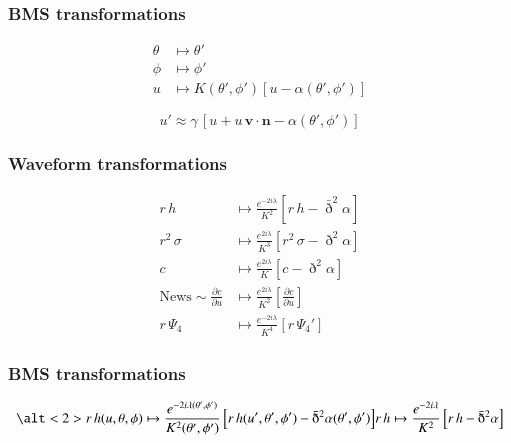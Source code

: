 \documentclass[12pt,xcolor={dvipsnames}]{beamer}
\renewcommand{\vec}{\bm}
\renewcommand{\vec}[1]{\boldsymbol{#1}}
\begin{document}
\begin{frame}
  \frametitle{BMS transformations}
  \begin{align*}
    \theta &\mapsto \theta' \\
    \phi &\mapsto \phi' \\
    u &\mapsto K(\theta', \phi') \left[u - \alpha(\theta', \phi')
        \right]
  \end{align*}

  \pause
  \begin{equation*}
    u' \approx \gamma\, \left[u + u\, \vec{v} \cdot \vec{n} -
      \alpha(\theta', \phi') \right]
  \end{equation*}
\end{frame}

\begin{frame}
  \frametitle{Waveform transformations}
  \begin{align*}
    r\, h %
    &\mapsto %
      \frac{e^{-2i \lambda}} {K^{2}} \left[ r\, h - \bar{\eth}^{2} \alpha
      \right] %
    \\
    r^{2}\, \sigma %
    &\mapsto %
      \frac{e^{2i \lambda}} {K^{3}} \left[ r^{2}\, \sigma - \eth^{2}
      \alpha \right] %
    \\
    c %
    &\mapsto %
      \frac{e^{2i \lambda}} {K} \left[ c - \eth^{2} \alpha \right] %
    \\[15pt]
    \text{News} \sim \frac{\partial c} {\partial u} %
    &\mapsto %
      \frac{e^{2i \lambda}} {K^{2}} \left[ \frac{\partial c}
      {\partial u} \right] %
    \\[15pt]
    r\, \Psi_{4} %
    &\mapsto %
      \frac{e^{-2i \lambda}} {K^{4}} \left[ r\, \Psi_{4}'\right]
  \end{align*}
\end{frame}

\begin{frame}
  \frametitle{BMS transformations}
  \begin{equation*}
    \alt<2>{
      r\, h(u, \theta, \phi) \mapsto \frac{e^{-2i \lambda(\theta', \phi')}}
      {K^{2}(\theta', \phi')} \left[ r\, h(u', \theta', \phi') -
        \bar{\eth}^{2} \alpha(\theta', \phi') \right]}{r\, h \mapsto
      \frac{e^{-2i \lambda}} {K^{2}\vphantom{(0)}} \left[ r\, h -
        \bar{\eth}^{2} \alpha \right]}
  \end{equation*}
\end{frame}
\end{document}

